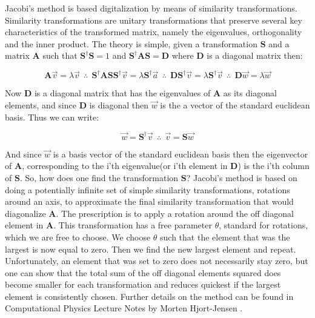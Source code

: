 \documentclass[a4paper,11pt]{article}
\begin{document}
{Jacobi's method is based digitalization by means of similarity transformations. Similarity transformations are unitary transformations that preserve several key characteristics of the transformed matrix, namely the eigenvalues, orthogonality and the inner product. The theory is simple, given a transformation $\mathbf{S}$ and a matrix $\mathbf{A}$ such that $\mathbf{S}^{\dagger}\mathbf{S} = 1$ and $\mathbf{S}^{\dagger}\mathbf{A}\mathbf{S} = \mathbf{D}$ where $\mathbf{D}$ is a diagonal matrix then:

\begin{equation}
\mathbf{A} \vec{v} = \lambda \vec{v} \: \: \therefore \: \: \mathbf{S}^{\dagger}\mathbf{A}\mathbf{S}\mathbf{S}^{\dagger}\vec{v} = \lambda \mathbf{S}^{\dagger} \vec{a} \: \: 
\therefore \: \: \mathbf{D} \mathbf{S}^{\dagger}\vec{v} = \lambda \mathbf{S}^{\dagger}\vec{v}\: \:  \therefore \: \: \mathbf{D}\vec{w} = \lambda \vec{w}
\end{equation} 

Now $\mathbf{D}$ is a diagonal matrix that has the eigenvalues of $\mathbf{A}$ as its diagonal elements, and since $\mathbf{D}$ is diagonal then $\vec{w}$ is the a vector of the standard euclidean basis. Thus we can write:

\begin{equation}
\vec{w} = \mathbf{S}^{\dagger} \vec{v} \: \: \therefore \: \: \vec{v} = \mathbf{S} \vec{w}
\end{equation}

And since $\vec{w}$ is a basis vector of the standard euclidean basis then the eigenvector of $\mathbf{A}$, corresponding to the i'th eigenvalue(or i'th element in $\mathbf{D}$) is the i'th column of $\mathbf{S}$. So, how does one find the transformation $\mathbf{S}$? Jacobi's method is based on doing a potentially infinite set of simple similarity transformations, rotations around an axis, to approximate the final similarity transformation that would diagonalize $\mathbf{A}$. The prescription is to apply a rotation around the off diagonal element in $\mathbf{A}$. This transformation has a free parameter $\theta$, standard for rotations, which we are free to choose. We choose $\theta$ such that the element that was the largest is now equal to zero. Then we find the new largest element and repeat. Unfortunately, an element that was set to zero does not necessarily stay zero, but one can show that the total sum of the off diagonal elements squared does become smaller for each transformation and reduces quickest if the largest element is consistently chosen. Further details on the method can be found in Computational Physics Lecture Notes by Morten Hjort-Jensen \cite{M.Hjort-Jensen_CompFys}.

}
\end{document}
